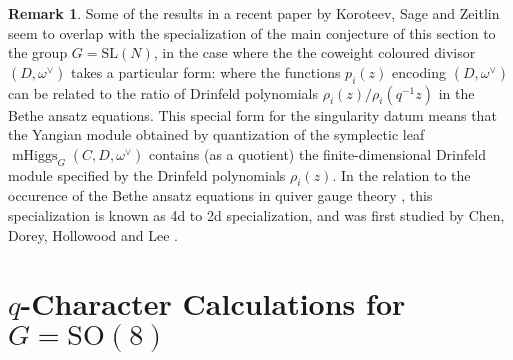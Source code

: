 \documentclass[11pt, oneside, reqno]{amsart}
\theoremstyle{definition} \newtheorem{definition}{Definition}[section]
\theoremstyle{definition} \newtheorem{remark}[definition]{Remark}
\theoremstyle{definition} \newtheorem{remarks}[definition]{Remarks}
\theoremstyle{definition} \newtheorem{question}[definition]{Question}
\theoremstyle{definition} \newtheorem*{note}{Note}
\theoremstyle{definition} \newtheorem{example}[definition]{Example}
\theoremstyle{definition} \newtheorem{examples}[definition]{Examples}
\newcommand{\SO}{\mathrm{SO}}
\newcommand{\SL}{\mathrm{SL}}
\DeclareMathOperator{\mhiggs}{mHiggs}
\begin{document}
 \begin{remark}
   Some of the results in a recent paper by Koroteev, Sage and Zeitlin \cite{KoroteevSageZeitlin} seem to overlap
   with the specialization of the main conjecture of this section to the group $G  = \SL(N)$, in the case where the the
   coweight coloured divisor $(D,\omega^\vee)$ takes a particular form: where the functions $p_i(z)$ encoding $(D,\omega^\vee)$ can be related to the ratio of Drinfeld polynomials $\rho_i(z)/\rho_i(q^{-1} z)$ in the Bethe ansatz equations. 
   This special form for the singularity datum means that the Yangian module obtained by quantization of the symplectic leaf $\mhiggs_G(C,D, \omega^\vee)$ contains (as a quotient) the finite-dimensional Drinfeld module specified by the Drinfeld polynomials $\rho_{i}(z)$. In the relation to the occurence of the Bethe ansatz equations in quiver gauge theory \cite{NekrasovPestunShatashvili}, this specialization is known as 4d to 2d specialization, and was first studied by Chen, Dorey, Hollowood and Lee \cite{ChenDoreyHollowoodLee, DoreyHollowoodLee}. 
\end{remark}

\appendix
\section{$q$-Character Calculations for $G=\SO(8)$} \label{D4_appendix}
\end{document}

